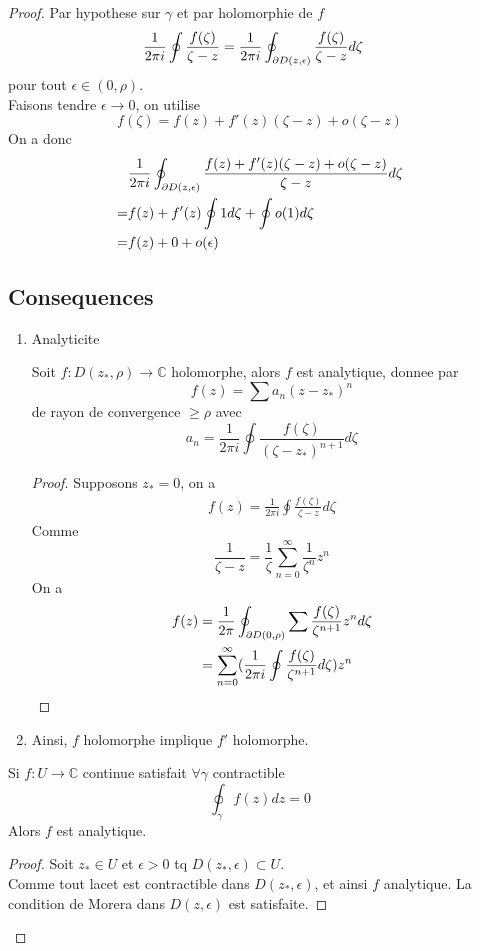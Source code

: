 \documentclass[../main.tex]{subfiles}
\begin{document}
\begin{proof}
Par hypothese sur $\gamma$ et par holomorphie de $f$ 
\begin{align*}
	\frac{1}{2\pi i} \oint \frac{f( \zeta) }{\zeta-z} &= \frac{1}{2\pi i}\oint_{\partial D( z,\epsilon) } \frac{f( \zeta) }{\zeta-z}d\zeta
\end{align*}
pour tout $\epsilon \in ( 0,\rho) $.\\
Faisons tendre $\epsilon\to 0$, on utilise
\[ 
	f( \zeta) = f( z) + f'( z) ( \zeta-z) + o( \zeta-z) 
\]
On a donc
\begin{align*}
	&\frac{1}{2\pi i}\oint_{\partial D( z,\epsilon) } \frac{f( z) + f'( z) ( \zeta-z) + o( \zeta-z) }{\zeta-z} d\zeta\\
	=& f( z) + f'( z) \oint 1 d\zeta + \oint o( 1) d\zeta\\
	=& f( z) + 0 + o( \epsilon) 
\end{align*}
\subsection*{Consequences}
\begin{enumerate}
\item Analyticite\\
	\begin{thm}
		Soit $f: D( z_*,\rho) \to \mathbb{C}$ holomorphe, alors $f$ est analytique, donnee par 
		\[ 
			f( z) = \sum a_n ( z-z_*) ^{n}
		\]
		de rayon de convergence $ \geq \rho$ avec
		\[ 
			a_n = \frac{1}{2\pi i} \oint \frac{f( \zeta) }{( \zeta-z_* )^{n+1}}d\zeta
		\]
		
		
	\end{thm}
	\begin{proof}
	Supposons $z_*=0$, on a 
\begin{align*}
	f( z) = \frac{1}{2\pi i }\oint \frac{f( \zeta) }{\zeta-z}d\zeta
\end{align*}
Comme 
\[ 
\frac{1}{\zeta-z}= \frac{1}{\zeta} \sum_{n=0}^{ \infty }\frac{1}{\zeta^{n}}z^{n}
\]
On a 
\begin{align*}
	f( z) &= \frac{1}{2\pi}\oint_{\partial D( 0,\rho) } \sum \frac{f( \zeta) }{\zeta^{n+1}}z^{n}d\zeta\\
	      &= \sum_{n=0}^{ \infty } ( \frac{1}{2\pi i}\oint \frac{f( \zeta) }{\zeta^{n+1}}d\zeta ) z^{n}
\end{align*}
	\end{proof}
\item 
Ainsi, $f$ holomorphe implique $f'$ holomorphe.

	
\end{enumerate}
\begin{thm}[Morera]
	Si $f:U \to \mathbb{C}$ continue satisfait $\forall \gamma$ contractible
	\[ 
		\oint_\gamma f( z) dz =0	
	\]
Alors $f$ est analytique.	
\end{thm}
\begin{proof}
	Soit $z_*\in U$ et $\epsilon>0$ tq $D( z_*, \epsilon) \subset U$.\\
	Comme tout lacet est contractible dans $D( z_*,\epsilon) $, et ainsi $f$ analytique. La condition de Morera dans $D( z,\epsilon)$ est satisfaite.
\end{proof}



\end{proof}
	
\end{document}
